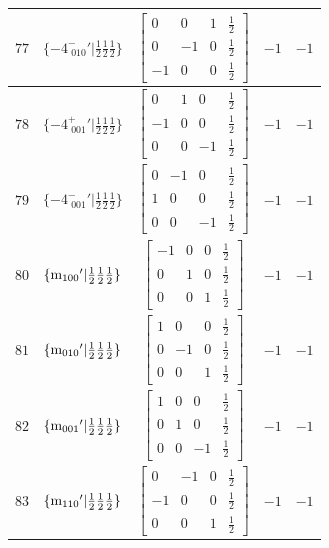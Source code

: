 \documentclass[fleqn,8pt]{jsarticle}
\begin{document}
\begin{longtable}{ccccc}
$ 77 $ & $ \{-4^{-}_{\,\,010}{}'|\frac{1}{2} \frac{1}{2} \frac{1}{2}\} $ & $ \begin{bmatrix} 0 & 0 & 1 & \frac{1}{2} \\ 0 & -1 & 0 & \frac{1}{2} \\ -1 & 0 & 0 & \frac{1}{2} \end{bmatrix} $ & $ -1 $ & $ -1 $ \\ \hline
$ 78 $ & $ \{-4^{+}_{\,\,001}{}'|\frac{1}{2} \frac{1}{2} \frac{1}{2}\} $ & $ \begin{bmatrix} 0 & 1 & 0 & \frac{1}{2} \\ -1 & 0 & 0 & \frac{1}{2} \\ 0 & 0 & -1 & \frac{1}{2} \end{bmatrix} $ & $ -1 $ & $ -1 $ \\ \hline
$ 79 $ & $ \{-4^{-}_{\,\,001}{}'|\frac{1}{2} \frac{1}{2} \frac{1}{2}\} $ & $ \begin{bmatrix} 0 & -1 & 0 & \frac{1}{2} \\ 1 & 0 & 0 & \frac{1}{2} \\ 0 & 0 & -1 & \frac{1}{2} \end{bmatrix} $ & $ -1 $ & $ -1 $ \\ \hline
$ 80 $ & $ \{{\rm m}_{100}{}'|\frac{1}{2} \frac{1}{2} \frac{1}{2}\} $ & $ \begin{bmatrix} -1 & 0 & 0 & \frac{1}{2} \\ 0 & 1 & 0 & \frac{1}{2} \\ 0 & 0 & 1 & \frac{1}{2} \end{bmatrix} $ & $ -1 $ & $ -1 $ \\ \hline
$ 81 $ & $ \{{\rm m}_{010}{}'|\frac{1}{2} \frac{1}{2} \frac{1}{2}\} $ & $ \begin{bmatrix} 1 & 0 & 0 & \frac{1}{2} \\ 0 & -1 & 0 & \frac{1}{2} \\ 0 & 0 & 1 & \frac{1}{2} \end{bmatrix} $ & $ -1 $ & $ -1 $ \\ \hline
$ 82 $ & $ \{{\rm m}_{001}{}'|\frac{1}{2} \frac{1}{2} \frac{1}{2}\} $ & $ \begin{bmatrix} 1 & 0 & 0 & \frac{1}{2} \\ 0 & 1 & 0 & \frac{1}{2} \\ 0 & 0 & -1 & \frac{1}{2} \end{bmatrix} $ & $ -1 $ & $ -1 $ \\ \hline
$ 83 $ & $ \{{\rm m}_{110}{}'|\frac{1}{2} \frac{1}{2} \frac{1}{2}\} $ & $ \begin{bmatrix} 0 & -1 & 0 & \frac{1}{2} \\ -1 & 0 & 0 & \frac{1}{2} \\ 0 & 0 & 1 & \frac{1}{2} \end{bmatrix} $ & $ -1 $ & $ -1 $ \\ \hline

\end{longtable}
\end{document}
